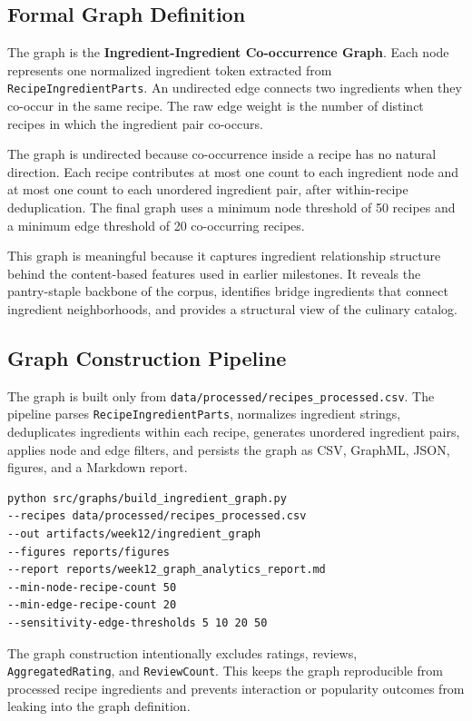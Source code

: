 \documentclass[11pt,a4paper]{article}
\begin{document}
\subsection{Formal Graph Definition}
The graph is the \textbf{Ingredient-Ingredient Co-occurrence Graph}. Each node represents one normalized ingredient token extracted from \texttt{RecipeIngredientParts}. An undirected edge connects two ingredients when they co-occur in the same recipe. The raw edge weight is the number of distinct recipes in which the ingredient pair co-occurs.

The graph is undirected because co-occurrence inside a recipe has no natural direction. Each recipe contributes at most one count to each ingredient node and at most one count to each unordered ingredient pair, after within-recipe deduplication. The final graph uses a minimum node threshold of 50 recipes and a minimum edge threshold of 20 co-occurring recipes.

This graph is meaningful because it captures ingredient relationship structure behind the content-based features used in earlier milestones. It reveals the pantry-staple backbone of the corpus, identifies bridge ingredients that connect ingredient neighborhoods, and provides a structural view of the culinary catalog.

\subsection{Graph Construction Pipeline}
The graph is built only from \texttt{data/processed/recipes\_processed.csv}. The pipeline parses \texttt{RecipeIngredientParts}, normalizes ingredient strings, deduplicates ingredients within each recipe, generates unordered ingredient pairs, applies node and edge filters, and persists the graph as CSV, GraphML, JSON, figures, and a Markdown report.

\begin{verbatim}
python src/graphs/build_ingredient_graph.py
--recipes data/processed/recipes_processed.csv
--out artifacts/week12/ingredient_graph
--figures reports/figures
--report reports/week12_graph_analytics_report.md
--min-node-recipe-count 50
--min-edge-recipe-count 20
--sensitivity-edge-thresholds 5 10 20 50
\end{verbatim}

The graph construction intentionally excludes ratings, reviews, \texttt{AggregatedRating}, and \texttt{ReviewCount}. This keeps the graph reproducible from processed recipe ingredients and prevents interaction or popularity outcomes from leaking into the graph definition.
\end{document}
